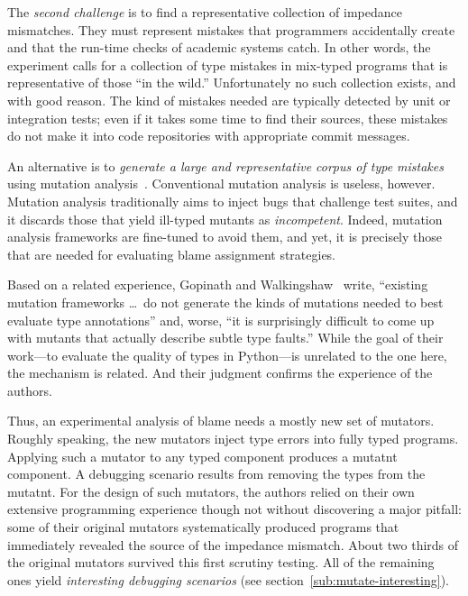 The {\em second challenge\/} is to find a representative collection of
impedance mismatches. They must represent mistakes that programmers
accidentally create and that the run-time checks of academic systems catch. In
other words, the experiment calls for a collection of type mistakes in
mix-typed programs that is representative of those ``in the wild.''
Unfortunately no such collection exists, and with good reason. The kind of
mistakes needed are typically detected by unit or integration tests; even if it
takes some time to find their sources, these mistakes do not make it into code
repositories with appropriate commit messages.

An alternative is to {\em generate a large and representative corpus of type
mistakes \/} using mutation analysis~\cite{lipton1971fault, demillo1978hints,
jia2011analysis}. Conventional mutation analysis is useless, however.  Mutation
analysis traditionally aims to inject bugs that challenge test suites, and it
discards those that yield ill-typed mutants as \emph{incompetent}. Indeed,
mutation analysis frameworks are fine-tuned to avoid them, and yet, it is
precisely those that are needed for evaluating blame assignment strategies.

Based on a related experience, Gopinath and Walkingshaw~\cite{gw-mutation} write,
``existing mutation frameworks \ldots\ do not generate the kinds of mutations
needed to best evaluate type annotations'' and, worse, ``it is surprisingly
difficult to come up with mutants that actually describe subtle type faults.''
While the goal of their work---to evaluate the quality of types in
Python---is unrelated to the one here, the mechanism is related. And their
judgment confirms the experience of the authors. 

Thus, an experimental analysis of blame needs a mostly new set of mutators.
Roughly speaking, the new mutators inject type errors into fully typed programs.
Applying such a mutator to any typed component produces a mutatnt component.  A
debugging scenario results from removing the types from the mutatnt. For the
design of such mutators, the authors relied on their own extensive programming
experience though not without discovering a major pitfall: some of their
original mutators systematically produced programs that immediately revealed the
source of the impedance mismatch. About two thirds of the original mutators
survived this first scrutiny testing. All of the remaining ones yield {\em
interesting debugging scenarios\/} (see section~\ref{sub:mutate-interesting}).

